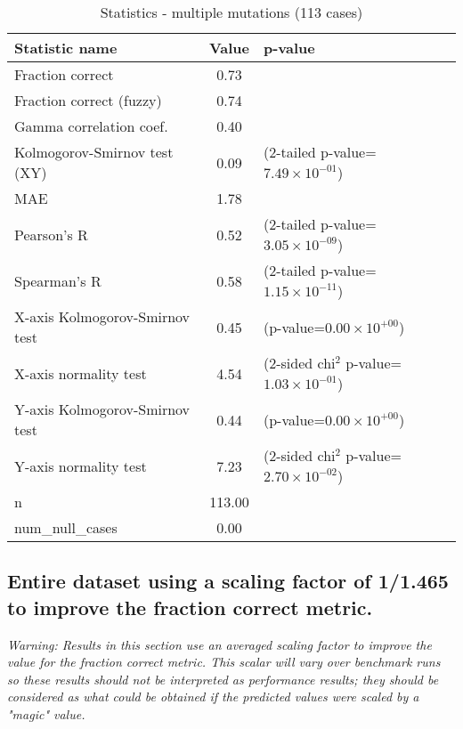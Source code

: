 \documentclass[10pt, letterpaper, oneside, titlepage, landscape]{scrreprt}
\begin{document}
\begin{table}[H]\begin{center}
\begin{tabular}{ l S[table-format=3.2] l}
Statistic name & {Value} & p-value\\
\hline
Fraction correct & 0.73 & \\
Fraction correct (fuzzy) & 0.74 & \\
Gamma correlation coef. & 0.40 & \\
Kolmogorov-Smirnov test (XY) & 0.09 & (2-tailed p-value=$7.49\times10^{-01}$)\\
MAE & 1.78 & \\
Pearson's R & 0.52 & (2-tailed p-value=$3.05\times10^{-09}$)\\
Spearman's R & 0.58 & (2-tailed p-value=$1.15\times10^{-11}$)\\
X-axis Kolmogorov-Smirnov test & 0.45 & (p-value=$0.00\times10^{+00}$)\\
X-axis normality test & 4.54 & (2-sided chi$^{2}$ p-value=$1.03\times10^{-01}$)\\
Y-axis Kolmogorov-Smirnov test & 0.44 & (p-value=$0.00\times10^{+00}$)\\
Y-axis normality test & 7.23 & (2-sided chi$^{2}$ p-value=$2.70\times10^{-02}$)\\
n & 113.00 & \\
num\_null\_cases & 0.00 & \\
\end{tabular}
\caption{Statistics - multiple mutations (113 cases)}
\end{center}\end{table}


\subsection{Entire dataset using a scaling factor of 1/1.465 to improve the fraction correct metric.}
\textit{Warning: Results in this section use an averaged scaling factor to improve the value for the fraction correct metric. This scalar will vary over benchmark runs so these results should not be interpreted as performance results; they should be considered as what could be obtained if the predicted values were scaled by a "magic" value.}
\end{document}
